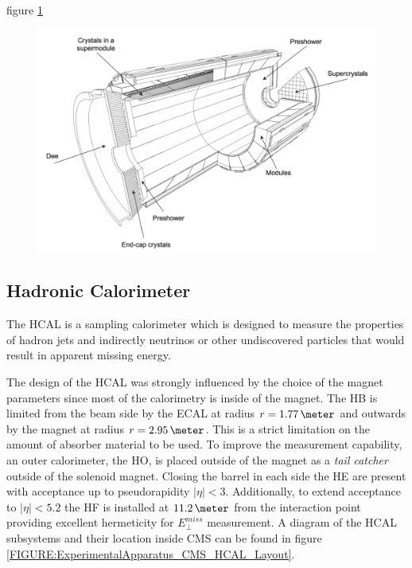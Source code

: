 figure \ref{FIGURE:ExperimentalApparatus_CMS_ECAL_Layout}

\begin{figure}[!htb]
  \centering
  \includegraphics[width=1.0\textwidth]{Chapter02/CMS/Images/CMS_ECAL_Layout.png}
  \caption{}
  \label{FIGURE:ExperimentalApparatus_CMS_ECAL_Layout}
\end{figure}


\subsection{Hadronic Calorimeter}
\label{SUBSECTION:ExperimentalApparatus_CMS_HCAL}


The \gls{HCAL} is a sampling calorimeter which is designed to measure the properties of hadron jets and indirectly neutrinos or other undiscovered particles that would result in apparent missing energy\cite{ARTICLE:CMSTechnicalProposal}. 

The design of the \gls{HCAL} was strongly influenced by the choice of the magnet parameters since most of the calorimetry is inside of the magnet. The \gls{HB} is limited from the beam side by the \gls{ECAL} at radius $r=1.77\,\meter$ and outwards by the magnet at radius $r=2.95\,\meter$. This is a strict limitation on the amount of absorber material to be used. To improve the measurement capability, an outer calorimeter, the \gls{HO}, is placed outside of the magnet as a \textit{tail catcher} outside of the solenoid magnet. Closing the barrel in each side the \gls{HE} are present with acceptance up to pseudorapidity $|\eta|<3$.  
Additionally, to extend acceptance to $|\eta|<5.2$ the \gls{HF} is installed at $11.2\,\meter$ from the interaction point providing excellent hermeticity for $E_{\perp}^{miss}$ measurement. A diagram of the \gls{HCAL} subsystems and their location inside \gls{CMS} can be found in figure \ref{FIGURE:ExperimentalApparatus_CMS_HCAL_Layout}.

